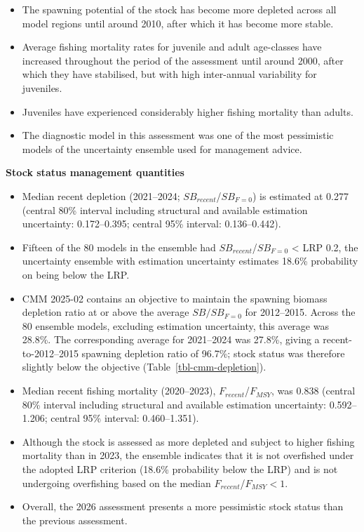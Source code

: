 \documentclass[
  english,
  a4paper,
  a4paper,
  11pt]{SCreport}
\begin{document}
\begin{itemize}
\item
  The spawning potential of the stock has become more depleted across
  all model regions until around 2010, after which it has become more
  stable.
\item
  Average fishing mortality rates for juvenile and adult age-classes
  have increased throughout the period of the assessment until around
  2000, after which they have stabilised, but with high inter-annual
  variability for juveniles.
\item
  Juveniles have experienced considerably higher fishing mortality than
  adults.
\item
  The diagnostic model in this assessment was one of the most
  pessimistic models of the uncertainty ensemble used for management
  advice.
\end{itemize}


\textbf{Stock status management quantities}

\begin{itemize}
\item
  Median recent depletion (2021--2024; \(SB_{recent}\)/\(SB_{F=0}\)) is
  estimated at 0.277 (central 80\% interval including structural and
  available estimation uncertainty: 0.172--0.395; central 95\% interval:
  0.136--0.442).
\item
  Fifteen of the 80 models in the ensemble had
  \(SB_{recent}\)/\(SB_{F=0}\) \textless{} LRP 0.2, the uncertainty
  ensemble with estimation uncertainty estimates 18.6\% probability on
  being below the LRP.
\item
  CMM 2025-02 contains an objective to maintain the spawning biomass
  depletion ratio at or above the average \(SB/SB_{F=0}\) for
  2012--2015. Across the 80 ensemble models, excluding estimation
  uncertainty, this average was 28.8\%. The corresponding average for
  2021--2024 was 27.8\%, giving a recent-to-2012--2015 spawning
  depletion ratio of 96.7\%; stock status was therefore slightly below
  the objective (Table~\ref{tbl-cmm-depletion}).
\item
  Median recent fishing mortality (2020--2023),
  \(F_{recent}\)/\(F_{MSY}\), was 0.838 (central 80\% interval including
  structural and available estimation uncertainty: 0.592--1.206; central
  95\% interval: 0.460--1.351).
\item
  Although the stock is assessed as more depleted and subject to higher
  fishing mortality than in 2023, the ensemble indicates that it is not
  overfished under the adopted LRP criterion (18.6\% probability below
  the LRP) and is not undergoing overfishing based on the median
  \(F_{recent}\)/\(F_{MSY}<1\).
\item
  Overall, the 2026 assessment presents a more pessimistic stock status
  than the previous assessment.
\end{itemize}
\end{document}
